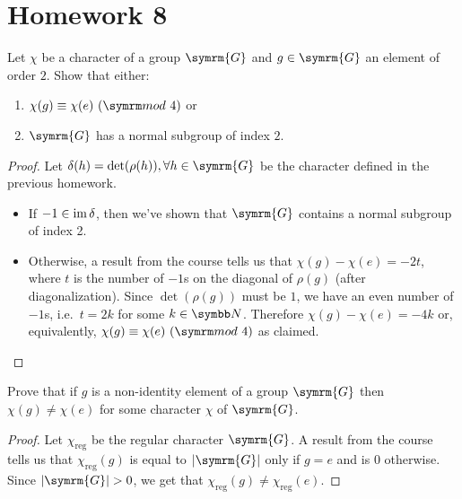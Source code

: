 \section*{Homework 8}

\begin{exercise}
Let \(\chi\) be a character of a group \(\symrm{G}\) and \(g \in \symrm{G}\) an element of order \(2\). Show that either:
\begin{enumerate}
    \item \(\chi(g) \equiv \chi(e) \Mod 4\) or
    \item \(\symrm{G}\) has a normal subgroup of index \(2\).
\end{enumerate}
\end{exercise}
\begin{proof}
Let \(\delta(h) = \det(\rho(h)), \forall h \in \symrm{G}\) be the character defined in the previous homework.
\begin{itemize}
    \item If \(-1 \in \operatorname*{im} \delta\), then we've shown that \(\symrm{G}\) contains a normal subgroup of index 2.
    
    \item Otherwise, a result from the course tells us that \(\chi(g) - \chi(e) = - 2t\), where \(t\) is the number of \(-1\)s on the diagonal of \(\rho(g)\) (after diagonalization). Since \(\det(\rho(g))\) must be \(1\), we have an even number of \(-1\)s, i.e.\ \(t = 2k\) for some \(k \in \naturals\). Therefore \(\chi(g) - \chi(e) = -4k\) or, equivalently, \(\chi(g) \equiv \chi(e) \Mod 4\) as claimed.
\end{itemize}
\end{proof}

\begin{exercise}
Prove that if \(g\) is a non-identity element of a group \(\symrm{G}\) then \(\chi(g) \neq \chi(e)\) for some character \(\chi\) of \(\symrm{G}\).
\end{exercise}
\begin{proof}
Let \(\chi_{\text{reg}}\) be the regular character \(\symrm{G}\). A result from the course tells us that \(\chi_{\text{reg}}(g)\) is equal to \(\abs{\symrm{G}}\) only if \(g = e\) and is \(0\) otherwise. Since \(\abs{\symrm{G}} > 0\), we get that \(\chi_{\text{reg}} (g) \neq \chi_{\text{reg}} (e)\).
\end{proof}

